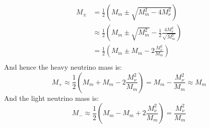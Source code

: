 \documentclass[12pt,a4]{article}
\begin{document}
\begin{enumerate}
\begin{enumerate}
\begin{align*}
          M_{\pm} &= \frac{1}{2} \left(M_m \pm \sqrt{M_m^2 - 4 M_\nu^2}\right)\\
                  &\approx \frac{1}{2} \left(M_m \pm \sqrt{M_m^2} -\frac{1}{2} \frac{4 M_\nu^2}{\sqrt{M_m^2}}\right)\\
                  &= \frac{1}{2} \left(M_m \pm M_m - 2 \frac{ M_\nu^2}{M_m}\right)\\
        \end{align*}
        And hence the heavy neutrino mass is:
        \begin{equation*}
          M_+ \approx \frac{1}{2} \left(M_m + M_m - 2 \frac{ M_\nu^2}{M_m}\right) = M_m - \frac{ M_\nu^2}{M_m} \approx M_m
        \end{equation*}
        And the light neutrino mass is:
        \begin{equation*}
          M_- \approx \frac{1}{2} \left(M_m - M_m + 2 \frac{ M_\nu^2}{M_m}\right) = \frac{ M_\nu^2}{M_m}
        \end{equation*}
    \end{enumerate}
\end{enumerate}
\end{document}
